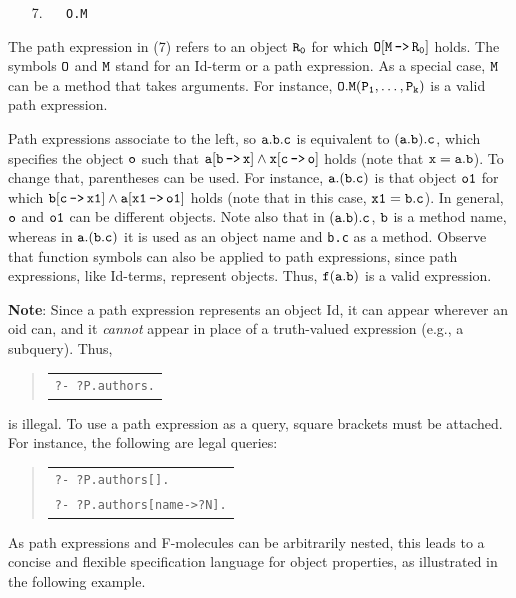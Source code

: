 \documentclass[11pt]{article}
\newenvironment{qrules}{\begin{quote}\tt\begin{tabular}[t]{l}}%
{\end{tabular}\end{quote}}
\newcommand{\mvd}{{\mbox{\tt \,->\,}}}  %
\begin{document}
  \medskip

\begin{enumerate} 
\item[7.]\label{eq-path-fun} ~~ {\tt O.M}
\end{enumerate} \medskip

\noindent
The path expression in (7) refers to an object $\tt R_0$ for which $\tt
O[M\mvd R_0]$ holds.  The symbols $\tt O$ and $\tt M$ stand for an Id-term
or a path expression.  As a special case, $\tt M$ can be a method that
takes arguments. For instance, $\tt O.M(P_1,\dots,P_k)$ is a valid path
expression.
  
Path expressions
associate to the left, so $\tt a.b.c$ is equivalent to $\tt (a.b).c$, which
specifies the object $\tt o$ such that $\tt a[b\mvd x] \land x[c\mvd o]$
holds (note that $\tt x=a.b$).
To change that, parentheses can be used. For instance, 
$\tt a.(b.c)$ is that object
$\tt o1$ for which $\tt b[c\mvd x1] \land a[x1\mvd o1]$ holds (note that in this
case, $\tt x1=b.c$). In general, $\tt o$ and $\tt o1$ can be different objects.
Note also that in $\tt (a.b).c$, $\tt b$ is a method name, whereas in $\tt
a.(b.c)$ it is used as an object name and {\tt b.c} as a method.  Observe
that function symbols can also be applied to path expressions, since path
expressions, like Id-terms, represent objects. Thus, $\tt f(a.b)$
is a valid expression.

{\bf Note}: Since a path expression represents an object Id,
it can appear wherever an oid can, and it \emph{cannot} appear in
place of a truth-valued expression (e.g., a subquery).
Thus,
\begin{qrules}
\tt ?- ?P.authors.
\end{qrules}
is illegal. To use a path expression as a
query, square brackets must be attached. For instance, the following are
legal queries:
\begin{qrules}
   \tt ?- ?P.authors[]. \\
   \tt ?- ?P.authors[name->?N].
\end{qrules}

As path expressions and F-molecules can be arbitrarily nested, this leads
to a concise and flexible specification language for object properties, as
illustrated in the following example.
\end{document}
